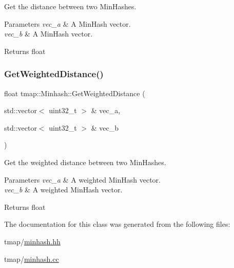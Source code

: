 Get the distance between two Min\+Hashes. 


\begin{DoxyParams}{Parameters}
{\em vec\+\_\+a} & A Min\+Hash vector. \\
\hline
{\em vec\+\_\+b} & A Min\+Hash vector. \\
\hline
\end{DoxyParams}
\begin{DoxyReturn}{Returns}
float 
\end{DoxyReturn}
\mbox{\label{classtmap_1_1Minhash_a7a8090c1629a6783fe0e17b227bd59ca}} 
\subsubsection{\texorpdfstring{Get\+Weighted\+Distance()}{GetWeightedDistance()}}
{\footnotesize\ttfamily float tmap\+::\+Minhash\+::\+Get\+Weighted\+Distance (\begin{DoxyParamCaption}\item[{std\+::vector$<$ uint32\+\_\+t $>$ \&}]{vec\+\_\+a,  }\item[{std\+::vector$<$ uint32\+\_\+t $>$ \&}]{vec\+\_\+b }\end{DoxyParamCaption})}



Get the weighted distance between two Min\+Hashes. 


\begin{DoxyParams}{Parameters}
{\em vec\+\_\+a} & A weighted Min\+Hash vector. \\
\hline
{\em vec\+\_\+b} & A weighted Min\+Hash vector. \\
\hline
\end{DoxyParams}
\begin{DoxyReturn}{Returns}
float 
\end{DoxyReturn}


The documentation for this class was generated from the following files\+:\begin{DoxyCompactItemize}
\item 
tmap/\hyperlink{minhash_8hh}{minhash.\+hh}\item 
tmap/\hyperlink{minhash_8cc}{minhash.\+cc}\end{DoxyCompactItemize}
